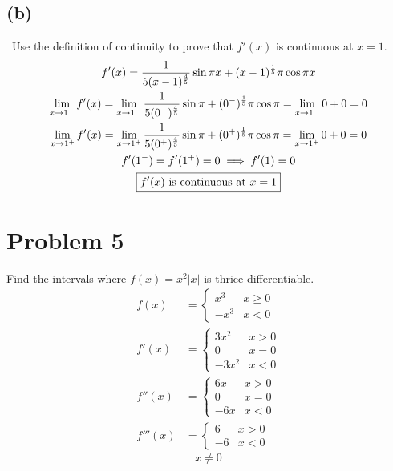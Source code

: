 \documentclass[12pt]{article}
\newcommand*{\limit}[2][x]{\ensuremath{\displaystyle\lim_{#1\to#2}}}
\newcommand{\problem}[1]{\section{Problem #1}}
\newcommand{\subproblem}[1]{\subsection{(#1)} \,}
\begin{document}
\subproblem{b} Use the definition of continuity to prove that $f'(x)$ is continuous at $x = 1$.
\begin{gather*}
    f'(x)= \frac{1}{5(x-1)^{\frac{4}{5}}} \sin \pi x+(x-1)^\frac{1}{5} \pi \cos \pi x\\
    \limit{1^-} f'(x)= 
    \limit{1^-} \frac{1}{5(0^-)^{\frac{4}{5}}} \sin \pi+(0^-)^\frac{1}{5} \pi \cos \pi=
    \limit{1^-}0+0=0\\
    \limit{1^+} f'(x)= 
    \limit{1^+} \frac{1}{5(0^+)^{\frac{4}{5}}} \sin \pi+(0^+)^\frac{1}{5} \pi \cos \pi=
    \limit{1^+}0+0=0\\
    f'(1^-)=f'(1^+)=0 \implies f'(1)=0\\
    \boxed{f'(x) $ is continuous at $ x=1}
\end{gather*}

\problem{5}
Find the intervals where $f(x)=x^2|x|$ is thrice differentiable.
\begin{align*}
    f(x)&=\begin{cases}
        x^3 &x \ge 0\\
        -x^3 &x<0
    \end{cases}\\
    f'(x)&=\begin{cases}
        3x^2 &x > 0\\
        0 &x=0\\
        -3x^2 &x<0
    \end{cases}\\
    f''(x)&=\begin{cases}
        6x &x > 0\\
        0 &x=0\\
        -6x &x<0
    \end{cases}\\
    f'''(x)&=\begin{cases}
        6 &x > 0\\
        -6 &x<0
    \end{cases}
\end{align*}
\[
\boxed{x\ne 0}
\]
\end{document}
